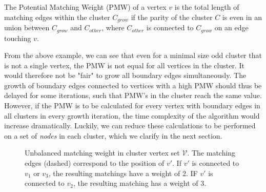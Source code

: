 \begin{lemma}
  The Potential Matching Weight (PMW) of a vertex $v$ is the total length of matching edges within the cluster $C_{grow}$ if the parity of the cluster $C$ is even in an union between $C_{grow}$ and $C_{other}$, where $C_{other}$ is connected to $C_{grow}$ on an edge touching $v$.
\end{lemma}

From the above example, we can see that even for a minimal size odd cluster that is not a single vertex, the PMW is not equal for all vertices in the cluster. It would therefore not be "fair" to grow all boundary edges simultaneously. The growth of boundary edges connected to vertices with a high PMW should thus be delayed for some iterations, such that PMW's in the cluster reach the same value. However, if the PMW is to be calculated for every vertex with boundary edges in all clusters in every growth iteration, the time complexity of the algorithm would increase dramatically. Luckily, we can reduce these calculations to be performed on a set of \emph{nodes} in each cluster, which we clarify in the next section.

\begin{figure}[h]
  \centering
  \vspace{1em}
  \caption{Unbalanced matching weight in cluster vertex set $\mathcal{V}$. The matching edges (dashed) correspond to the position of $v'$. If $v'$ is connected to $v_1$ or $v_3$, the resulting matchings have a weight of 2. IF $v'$ is connected to $v_2$, the resulting matching has a weight of 3.}\label{fig:PMW}
\end{figure}

